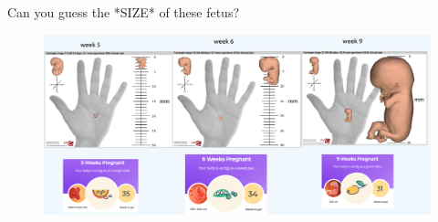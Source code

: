 {
\begin{frame}{Can you guess the *SIZE* of these fetus?}
      \begin{figure}
        \centering
        \includegraphics[width=1.0\textwidth]{./figures/fetal-size/versions/drawing-v00.png}
      \end{figure}
\end{frame}
}


